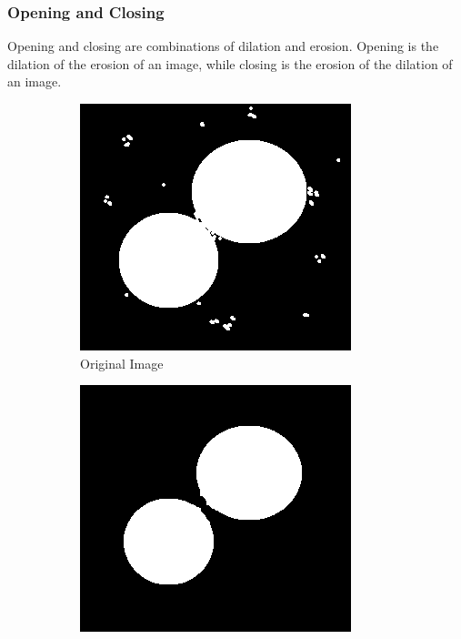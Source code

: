 \subsubsection{Opening and Closing}
Opening and closing are combinations of dilation and erosion. Opening is the dilation of the erosion of an image, while closing is the erosion of the dilation of an image. 

\begin{figure}[h]
    \centering
    \begin{subfigure}{0.33\textwidth}
        \centering
        \includegraphics[width=.99\linewidth]{images/literature/morphological/dots}
        \caption{Original Image}
    \end{subfigure}%
    \begin{subfigure}{.33\textwidth}
        \centering
        \includegraphics[width=.99\linewidth]{images/literature/morphological/opening}

\end{subfigure}
\end{figure}
